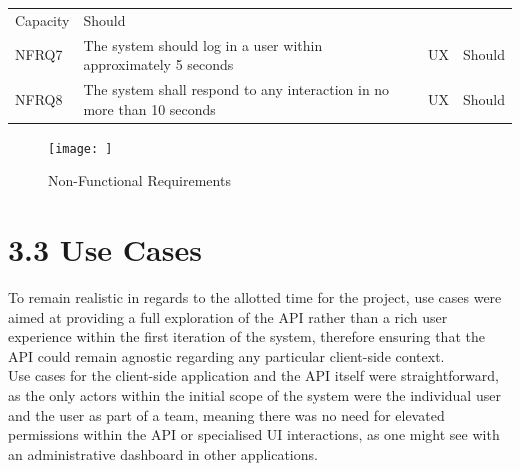 \documentclass[12pt]{report}
\begin{document}
\begin{longtable}[]{@{}llll@{}}
\begin{minipage}[t]{0.10\columnwidth}
Capacity\strut
\end{minipage} & \begin{minipage}[t]{0.11\columnwidth}\raggedright\strut
Should\strut
\end{minipage}\tabularnewline
\begin{minipage}[t]{0.05\columnwidth}\raggedright\strut
NFRQ7\strut
\end{minipage} & \begin{minipage}[t]{0.63\columnwidth}\raggedright\strut
The system should log in a user within approximately 5 seconds\strut
\end{minipage} & \begin{minipage}[t]{0.10\columnwidth}\raggedright\strut
UX\strut
\end{minipage} & \begin{minipage}[t]{0.11\columnwidth}\raggedright\strut
Should\strut
\end{minipage}\tabularnewline
\begin{minipage}[t]{0.05\columnwidth}\raggedright\strut
NFRQ8\strut
\end{minipage} & \begin{minipage}[t]{0.63\columnwidth}\raggedright\strut
The system shall respond to any interaction in no more than 10
seconds\strut
\end{minipage} & \begin{minipage}[t]{0.10\columnwidth}\raggedright\strut
UX\strut
\end{minipage} & \begin{minipage}[t]{0.11\columnwidth}\raggedright\strut
Should\strut
\end{minipage}\tabularnewline
\bottomrule
\end{longtable}

\begin{figure}[htbp]
\centering
\texttt{[image: ]}
\caption{Non-Functional Requirements}
\end{figure}

\section{3.3 Use Cases}\label{use-cases}

To remain realistic in regards to the allotted time for the project, use
cases were aimed at providing a full exploration of the API rather than
a rich user experience within the first iteration of the system,
therefore ensuring that the API could remain agnostic regarding any
particular client-side context.\\
Use cases for the client-side application and the API itself were
straightforward, as the only actors within the initial scope of the
system were the individual user and the user as part of a team, meaning
there was no need for elevated permissions within the API or specialised
UI interactions, as one might see with an administrative dashboard in
other applications.
\end{document}
